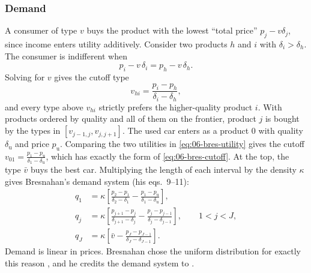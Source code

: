 \subsubsection{Demand}\label{sec:06-bres-demand}

A consumer of type $v$ buys the product with the lowest ``total price'' $p_j - v\delta_j$, since income enters
utility additively. Consider two products $h$ and $i$ with $\delta_i > \delta_h$. The consumer is indifferent when
\begin{equation*}
  p_i - v\,\delta_i = p_h - v\,\delta_h .
\end{equation*}
Solving for $v$ gives the cutoff type
\begin{equation}\label{eq:06-bres-cutoff}
  v_{hi} = \frac{p_i - p_h}{\delta_i - \delta_h},
\end{equation}
and every type above $v_{hi}$ strictly prefers the higher-quality product $i$. With products ordered by quality and
all of them on the frontier, product $j$ is bought by the types in $[v_{j-1,j}, v_{j,j+1}]$. The used car enters as
a product $0$ with quality $\delta_{\mathrm u}$ and price $p_{\mathrm u}$. Comparing the two utilities in
\eqref{eq:06-bres-utility} gives the cutoff $v_{01} = \frac{p_1 - p_{\mathrm u}}{\delta_1 - \delta_{\mathrm u}}$,
which has exactly the form of \eqref{eq:06-bres-cutoff}. At the top, the type $\bar v$ buys the best car. Multiplying
the length of each interval by the density $\kappa$ gives Bresnahan's demand system (his eqs.~9--11):
\begin{equation}\label{eq:06-bres-demand}
\begin{aligned}
  q_1 &= \kappa\left[\frac{p_2 - p_1}{\delta_2 - \delta_1} - \frac{p_1 - p_{\mathrm u}}{\delta_1 - \delta_{\mathrm u}}\right],\\
  q_j &= \kappa\left[\frac{p_{j+1} - p_j}{\delta_{j+1} - \delta_j} - \frac{p_j - p_{j-1}}{\delta_j - \delta_{j-1}}\right],
  \qquad 1 < j < J,\\
  q_J &= \kappa\left[\bar v - \frac{p_J - p_{J-1}}{\delta_J - \delta_{J-1}}\right].
\end{aligned}
\end{equation}
Demand is linear in prices. Bresnahan chose the uniform distribution for exactly this reason
\citep[p.~460]{Bresnahan1987}, and he credits the demand system to \citet{PrescottVisscher1977}.

